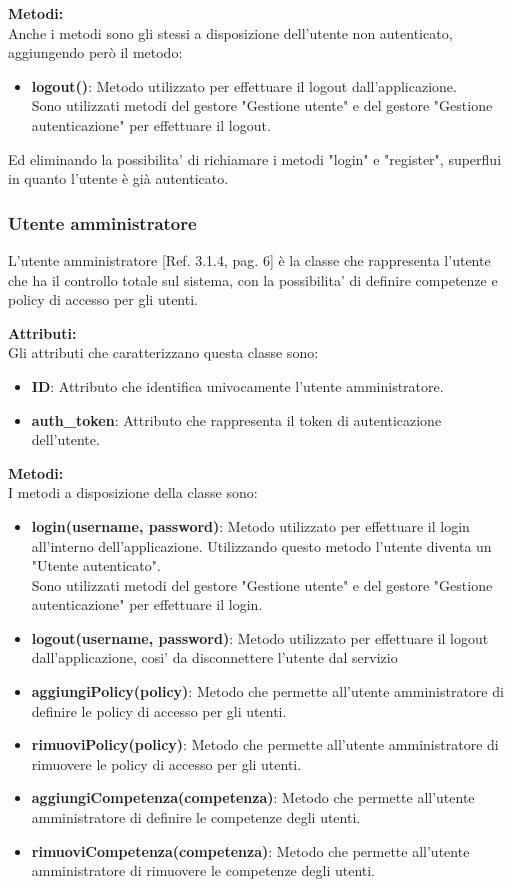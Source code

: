 \documentclass{article}
\begin{document}
\textbf{Metodi:}\\
Anche i metodi sono gli stessi a disposizione dell'utente non autenticato, aggiungendo però il metodo:
\begin{itemize}
    \item \textbf{logout()}: Metodo utilizzato per effettuare il logout dall'applicazione.\\Sono utilizzati metodi del gestore "Gestione utente" e del gestore "Gestione autenticazione" per effettuare il logout.
\end{itemize}
Ed eliminando la possibilita' di richiamare i metodi "login" e "register", superflui in quanto l'utente è già autenticato.

\subsubsection{Utente amministratore}

L'utente amministratore [Ref. 3.1.4, pag. 6] è la classe che rappresenta l'utente che ha il controllo totale sul sistema, con la possibilita' di definire competenze e policy di accesso per gli utenti.

\textbf{Attributi:}\\
Gli attributi che caratterizzano questa classe sono:
\begin{itemize}
    \item \textbf{ID}: Attributo che identifica univocamente l'utente amministratore.
    \item \textbf{auth\_token}: Attributo che rappresenta il token di autenticazione dell'utente.
\end{itemize}

\textbf{Metodi:}\\
I metodi a disposizione della classe sono:

\begin{itemize}
    \item \textbf{login(username, password)}: Metodo utilizzato per effettuare il login all'interno dell'applicazione. Utilizzando questo metodo l'utente diventa un "Utente autenticato".\\Sono utilizzati metodi del gestore "Gestione utente" e del gestore "Gestione autenticazione" per effettuare il login.
    \item \textbf{logout(username, password)}: Metodo utilizzato per effettuare il logout dall'applicazione, cosi' da disconnettere l'utente dal servizio
    \item \textbf{aggiungiPolicy(policy)}: Metodo che permette all'utente amministratore di definire le policy di accesso per gli utenti.
    \item \textbf{rimuoviPolicy(policy)}: Metodo che permette all'utente amministratore di rimuovere le policy di accesso per gli utenti.
    \item \textbf{aggiungiCompetenza(competenza)}: Metodo che permette all'utente amministratore di definire le competenze degli utenti.
    \item \textbf{rimuoviCompetenza(competenza)}: Metodo che permette all'utente amministratore di rimuovere le competenze degli utenti.
\end{itemize}
\end{document}
